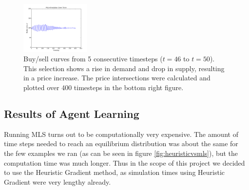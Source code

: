 \documentclass[11pt]{article}
\begin{document}
\begin{figure}
  \includegraphics[width=0.31\textwidth]{figures/price_history.png}
  \caption[Price Evolution]{Buy/sell curves from 5 consecutive timesteps ($t=46$ to $t=50$). This selection shows a rise in demand and drop in supply, resulting in a price increase. The price intersections were calculated and plotted over 400 timesteps in the bottom right figure.}
  \label{fig:singleStep}
\end{figure}

\subsection{Results of Agent Learning}
Running MLS turns out to be computationally very expensive. The amount of time steps needed to reach an equilibrium distribution was about the same for the few examples we ran (as can be seen in figure \ref{fig:heuristicvsmls}), but the computation time was much longer. Thus in the scope of this project we decided to use the Heuristic Gradient method, as simulation times using Heuristic Gradient were very lengthy already. \\
\end{document}
